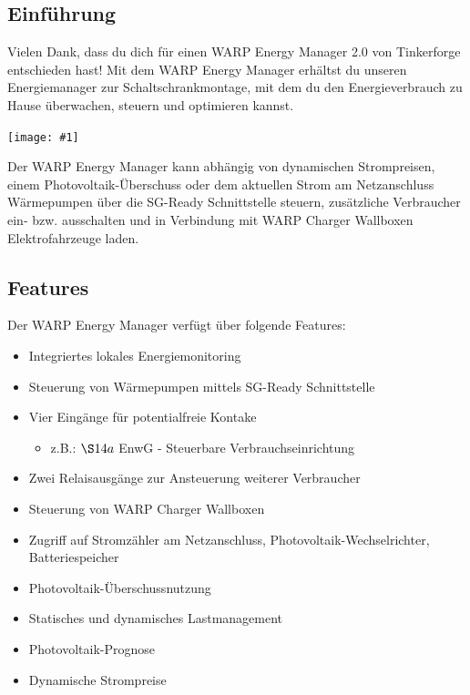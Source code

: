 \documentclass[a4paper,10pt]{article}
\newcommand{\gfx}[1]{\texttt{[image: \#1]}}
\begin{document}
\begin{multicols*}{2}
	\tableofcontents
	\newpage
	\section{Einführung}
	Vielen Dank, dass du dich für einen WARP Energy Manager 2.0 von Tinkerforge entschieden hast!
	Mit dem WARP Energy Manager
	erhältst du unseren Energiemanager zur Schaltschrankmontage, mit dem du den
	Energieverbrauch zu Hause überwachen, steuern und optimieren kannst.

	\gfx{./img_v2/warp-energy-manager2.png}

	Der WARP Energy Manager kann abhängig von dynamischen Strompreisen, einem Photovoltaik-Überschuss oder dem aktuellen Strom am Netzanschluss
    Wärmepumpen über die SG-Ready Schnittstelle steuern, zusätzliche Verbraucher ein- bzw. ausschalten und in Verbindung mit WARP Charger Wallboxen 
    Elektrofahrzeuge laden.

	\subsection{Features}
	Der WARP Energy Manager verfügt über folgende Features:
    
    \begin{itemize}
        \item Integriertes lokales Energiemonitoring
        \item Steuerung von Wärmepumpen mittels SG-Ready Schnittstelle
        \item Vier Eingänge für potentialfreie Kontake
        \begin{itemize}
            \item z.B.: $\S14a$ EnwG - Steuerbare Verbrauchseinrichtung
        \end{itemize}
        \item Zwei Relaisausgänge zur Ansteuerung weiterer Verbraucher
        \item Steuerung von WARP Charger Wallboxen
        \item Zugriff auf Stromzähler am Netzanschluss, Photovoltaik-Wechselrichter, Batteriespeicher
        \item Photovoltaik-Überschussnutzung
        \item Statisches und dynamisches Lastmanagement
        \item Photovoltaik-Prognose
        \item Dynamische Strompreise
    \end{itemize}
    

\end{multicols*}
\end{document}
